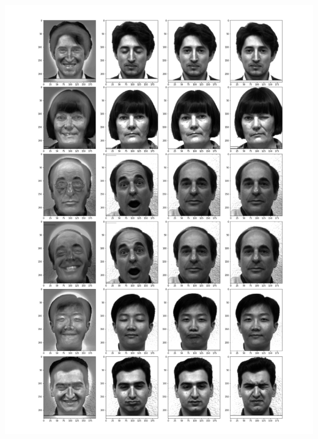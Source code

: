 \documentclass[]{article}
\begin{document}
\includegraphics[width=15cm]{result2.jpg}
\end{document}

